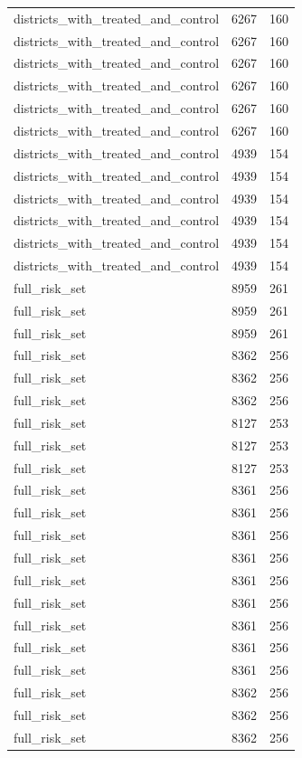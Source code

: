 \begin{table}[!htbp]
\begin{tabular}{lrr}
districts\_with\_treated\_and\_control & 6267 & 160 \\
districts\_with\_treated\_and\_control & 6267 & 160 \\
districts\_with\_treated\_and\_control & 6267 & 160 \\
districts\_with\_treated\_and\_control & 6267 & 160 \\
districts\_with\_treated\_and\_control & 6267 & 160 \\
districts\_with\_treated\_and\_control & 6267 & 160 \\
districts\_with\_treated\_and\_control & 4939 & 154 \\
districts\_with\_treated\_and\_control & 4939 & 154 \\
districts\_with\_treated\_and\_control & 4939 & 154 \\
districts\_with\_treated\_and\_control & 4939 & 154 \\
districts\_with\_treated\_and\_control & 4939 & 154 \\
districts\_with\_treated\_and\_control & 4939 & 154 \\
full\_risk\_set & 8959 & 261 \\
full\_risk\_set & 8959 & 261 \\
full\_risk\_set & 8959 & 261 \\
full\_risk\_set & 8362 & 256 \\
full\_risk\_set & 8362 & 256 \\
full\_risk\_set & 8362 & 256 \\
full\_risk\_set & 8127 & 253 \\
full\_risk\_set & 8127 & 253 \\
full\_risk\_set & 8127 & 253 \\
full\_risk\_set & 8361 & 256 \\
full\_risk\_set & 8361 & 256 \\
full\_risk\_set & 8361 & 256 \\
full\_risk\_set & 8361 & 256 \\
full\_risk\_set & 8361 & 256 \\
full\_risk\_set & 8361 & 256 \\
full\_risk\_set & 8361 & 256 \\
full\_risk\_set & 8361 & 256 \\
full\_risk\_set & 8361 & 256 \\
full\_risk\_set & 8362 & 256 \\
full\_risk\_set & 8362 & 256 \\
full\_risk\_set & 8362 & 256 \\

\end{tabular}
\end{table}
